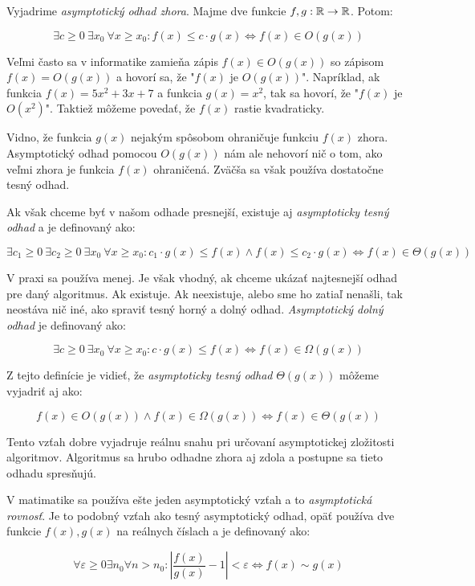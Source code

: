 Vyjadrime \emph{asymptotický odhad zhora}. 
Majme dve funkcie $f, g: \mathbb{R} \rightarrow \mathbb{R}$. Potom:

$$\exists c\ge 0\ \exists x_0\ \forall x\ge x_0: 
f(x) \leq c\cdot g(x) \iff f(x) \in O(g(x))$$

Veľmi často sa v informatike zamieňa zápis $f(x) \in O(g(x))$ so zápisom 
$f(x) = O(g(x))$ a hovorí sa, že "$f(x)$ je $O(g(x))$". Napríklad, ak 
funkcia $f(x) = 5x^2+3x+7$ a funkcia $g(x) = x^2$, tak sa hovorí, 
že "$f(x)$ je $O(x^2)$". Taktiež môžeme povedať, že $f(x)$ rastie 
kvadraticky.

Vidno, že funkcia $g(x)$ nejakým spôsobom ohraničuje funkciu $f(x)$ zhora. 
Asymptotický odhad pomocou $O(g(x))$ nám ale nehovorí nič o tom, ako veľmi 
zhora je funkcia $f(x)$ ohraničená. Zväčša sa však používa dostatočne tesný 
odhad.

Ak však chceme byť v našom odhade presnejší, existuje aj \emph{asymptoticky tesný 
odhad} a je definovaný ako:

$$\exists c_1\ge 0\ \exists c_2\ge 0\ \exists x_0\ \forall x\ge x_0: 
c_1\cdot g(x)\leq f(x) \wedge f(x) \leq c_2\cdot g(x) \iff f(x) \in \Theta (g(x))$$

V praxi sa používa menej. Je však vhodný, ak chceme ukázať najtesnejší odhad 
pre daný algoritmus. Ak existuje. Ak neexistuje, alebo sme ho zatiaľ nenašli, 
tak neostáva nič iné, ako spraviť tesný horný a dolný odhad. 
\emph{Asymptotický dolný odhad} je 
definovaný ako:

$$\exists c\ge 0\ \exists x_0\ \forall x\ge x_0: 
c\cdot g(x) \leq f(x) \iff f(x) \in \Omega (g(x))$$

Z tejto definície je vidieť, že \emph{asymptoticky tesný odhad} $\Theta (g(x))$ 
môžeme vyjadriť aj ako: 

$$f(x) \in O(g(x)) \wedge f(x) \in \Omega (g(x)) \iff f(x) \in \Theta (g(x))$$

Tento vzťah dobre vyjadruje reálnu snahu pri určovaní asymptotickej zložitosti 
algoritmov. Algoritmus sa hrubo odhadne zhora aj zdola a postupne sa tieto 
odhadu spresňujú. 

V matimatike sa používa ešte jeden asymptotický vzťah a to 
\emph{asymptotická rovnosť}. Je to podobný vzťah ako tesný asymptotický odhad, 
opäť používa dve funkcie $f(x), g(x)$ na reálnych číslach a je definovaný ako:

$$\forall \varepsilon \ge 0 \exists n_0 \forall n > n_0: 
\left| \frac{f(x)}{g(x)} - 1 \right| < \varepsilon \iff f(x) \sim g(x)$$

